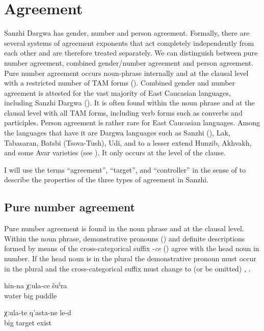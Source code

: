 \chapter{Agreement}
\label{cpt:Agreement}

Sanzhi Dargwa has gender, number and person agreement. Formally, there are several systems of agreement exponents that act completely independently from each other and are therefore treated separately. We can distinguish between pure number agreement, combined gender/number agreement and person agreement. Pure number agreement occurs noun-phrase internally and at the clausal level with a restricted number of TAM forms (). Combined gender and number agreement is attested for the vast majority of East Caucasian languages, including Sanzhi Dargwa (). It is often found within the noun phrase and at the clausal level with all TAM forms, including verb forms such as converbs and participles. Person agreement is rather rare for East Caucasian languages. Among the languages that have it are Dargwa languages such as Sanzhi (), Lak, Tabasaran, Batsbi (Tsova-Tush), Udi, and to a lesser extend Hunzib, Akhvakh, and some Avar varieties (see \citealp{Helmbrecht1996, vandenBerg1999, Schulze2007}). It only occurs at the level of the clause.

I will use the terms ``agreement'', ``target'', and ``controller'' in the sense of \citealp{Corbett2006} to describe the properties of the three types of agreement in Sanzhi.



\section{Pure number agreement}
\label{sec:Pure number agreement}
Pure number agreement is found in the noun phrase and at the clausal level. Within the noun phrase, demonstrative pronouns () and definite descriptions formed by means of the cross-categorical suffix -\textit{ce} () agree with the head noun in number. If the head noun is in the plural the demonstrative pronoun must occur in the plural and the cross-categorical suffix must change to  (or be omitted)  , .
%
\begin{exe}
	\ex	\label{ex:‎a big puddle of water}
	\gll	hin-na	χːula-ce	šuˁra\\
		water	big	puddle\\
	\glt	{}

	\ex	\label{ex:‎There are big targets}
	\gll	χːula-te	q'asta-ne	le-d\\
		big 	target	exist\\
	\glt	{}
\end{exe}


